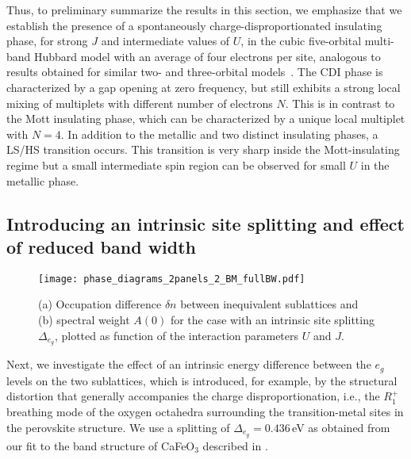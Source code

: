 \documentclass[aps,prb,twocolumn,superscriptaddress,10pt]{revtex4-1}
\newcommand{\pref}[1]{\prettyref{#1}}%
\newcommand{\BM}{\ensuremath{{R_1^+}}\xspace}
\newcommand{\eg}{\ensuremath{{e_g}}\xspace}
\begin{document}
Thus, to preliminary summarize the results in this section, we emphasize that we establish the presence of a spontaneously charge-disproportionated insulating phase, for strong $J$ and intermediate values of $U$, in the cubic five-orbital multi-band Hubbard model with an average of four electrons per site, analogous to results obtained for similar two- and three-orbital models~\cite{subedi_low-energy_2015, isidori_charge_2019}.
The CDI phase is characterized by a gap opening at zero frequency, but still exhibits a strong local mixing of multiplets with different number of electrons $N$. This is in contrast to the Mott insulating phase, which can be characterized by a unique local multiplet with $N=4$.
%
In addition to the metallic and two distinct insulating phases, a LS/HS transition occurs. This transition is very sharp inside the Mott-insulating regime but a small intermediate spin region can be observed for small $U$ in the metallic phase.

\subsection{Introducing an intrinsic site splitting and effect of reduced band width}

\begin{figure}
    \centering
    \texttt{[image: phase\_diagrams\_2panels\_2\_BM\_fullBW.pdf]}
    \caption{(a) Occupation difference $\delta n$ between inequivalent sublattices and (b) spectral weight $A(0)$ for the case with an intrinsic site splitting $\Delta_{e_g}$, plotted as function of the interaction parameters $U$ and $J$.}
    \label{fig:characteristics_BM_fullBW}
\end{figure}

Next, we investigate the effect of an intrinsic energy difference between the \eg levels on the two sublattices, which is introduced, for example, by the structural distortion that generally accompanies the charge disproportionation, i.e., the \BM breathing mode of the oxygen octahedra surrounding the transition-metal sites in the perovskite structure. We use a splitting of $\Delta_\eg = 0.436$\,eV as obtained from our fit to the band structure of CaFeO$_3$ described in \pref{sec:fitting}.
\end{document}
